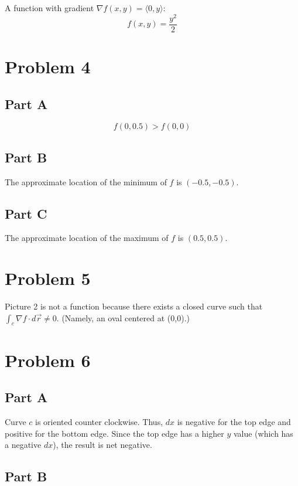 \documentclass{article}
\begin{document}
A function with gradient $\nabla f(x, y) = \langle 0, y \rangle$:
$$ f(x, y) = \frac{y^2}{2} $$

\section*{Problem 4}

\subsection*{Part A}

$$ f(0, 0.5) > f(0,0) $$

\subsection*{Part B} 

The approximate location of the minimum of $f$ is $(-0.5, -0.5)$.

\subsection*{Part C}

The approximate location of the maximum of $f$ is $(0.5, 0.5)$.

\section*{Problem 5}

Picture 2 is not a function because there exists a closed curve such that
$\int_c \nabla f \cdot d\vec{r} \neq 0$. (Namely, an oval centered at (0,0).)

\section*{Problem 6}

\subsection*{Part A}

Curve $c$ is oriented counter clockwise. Thus, $dx$ is negative for the top edge
and positive for the bottom edge. Since the top edge has a higher $y$ value
(which has a negative $dx$), the result is net negative.

\subsection*{Part B}
\end{document}
